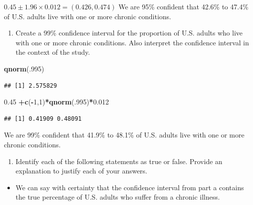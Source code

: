 \documentclass[
]{book}
\newenvironment{Shaded}{\begin{snugshade}}{\end{snugshade}}
\newcommand{\DecValTok}[1]{\textcolor[rgb]{0.00,0.00,0.81}{#1}}
\newcommand{\FloatTok}[1]{\textcolor[rgb]{0.00,0.00,0.81}{#1}}
\newcommand{\KeywordTok}[1]{\textcolor[rgb]{0.13,0.29,0.53}{\textbf{#1}}}
\newcommand{\NormalTok}[1]{#1}
\newcommand{\OperatorTok}[1]{\textcolor[rgb]{0.81,0.36,0.00}{\textbf{#1}}}
\providecommand{\tightlist}{%
  \setlength{\itemsep}{0pt}\setlength{\parskip}{0pt}}
\begin{document}
\(0.45 \pm 1.96 \times 0.012 = (0.426, 0.474)\)
We are 95\% confident that 42.6\% to 47.4\% of U.S. adults live with one or more chronic conditions.

\begin{enumerate}
\def\labelenumi{\alph{enumi}.}
\setcounter{enumi}{1}
\tightlist
\item
  Create a 99\% confidence interval for the proportion of U.S. adults who live with one or more chronic conditions. Also interpret the confidence interval in the context of the study.
\end{enumerate}

\begin{Shaded}
\begin{Highlighting}[]
\KeywordTok{qnorm}\NormalTok{(.}\DecValTok{995}\NormalTok{)}
\end{Highlighting}
\end{Shaded}

\begin{verbatim}
## [1] 2.575829
\end{verbatim}

\begin{Shaded}
\begin{Highlighting}[]
\FloatTok{0.45} \OperatorTok{+}\KeywordTok{c}\NormalTok{(}\OperatorTok{-}\DecValTok{1}\NormalTok{,}\DecValTok{1}\NormalTok{)}\OperatorTok{*}\KeywordTok{qnorm}\NormalTok{(.}\DecValTok{995}\NormalTok{)}\OperatorTok{*}\FloatTok{0.012}
\end{Highlighting}
\end{Shaded}

\begin{verbatim}
## [1] 0.41909 0.48091
\end{verbatim}

We are 99\% confident that 41.9\% to 48.1\% of U.S. adults live with one or more chronic conditions.

\begin{enumerate}
\def\labelenumi{\alph{enumi}.}
\setcounter{enumi}{2}
\tightlist
\item
  Identify each of the following statements as true or false. Provide an explanation to justify each of your answers.
\end{enumerate}

\begin{itemize}
\tightlist
\item
  We can say with certainty that the confidence interval from part a contains the true percentage of U.S. adults who suffer from a chronic illness.
\end{itemize}
\end{document}
